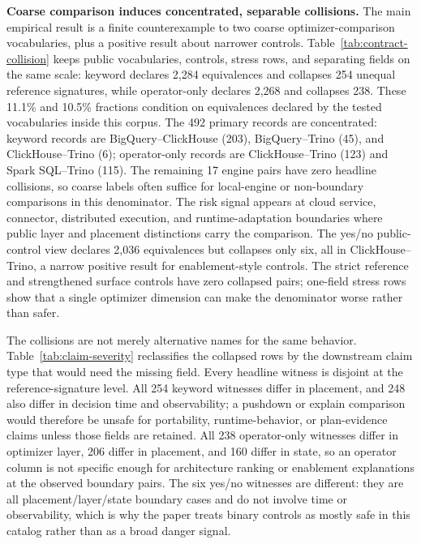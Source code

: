 \textbf{Coarse comparison induces concentrated, separable collisions.} The main empirical result is a finite counterexample to two coarse optimizer-comparison vocabularies, plus a positive result about narrower controls.  Table~\ref{tab:contract-collision} keeps public vocabularies, controls, stress rows, and separating fields on the same scale: keyword declares 2,284 equivalences and collapses 254 unequal reference signatures, while operator-only declares 2,268 and collapses 238.  These 11.1\% and 10.5\% fractions condition on equivalences declared by the tested vocabularies inside this corpus.  The 492 primary records are concentrated: keyword records are BigQuery--ClickHouse (203), BigQuery--Trino (45), and ClickHouse--Trino (6); operator-only records are ClickHouse--Trino (123) and Spark SQL--Trino (115).  The remaining 17 engine pairs have zero headline collisions, so coarse labels often suffice for local-engine or non-boundary comparisons in this denominator.  The risk signal appears at cloud service, connector, distributed execution, and runtime-adaptation boundaries where public layer and placement distinctions carry the comparison.  The yes/no public-control view declares 2,036 equivalences but collapses only six, all in ClickHouse--Trino, a narrow positive result for enablement-style controls.  The strict reference and strengthened surface controls have zero collapsed pairs; one-field stress rows show that a single optimizer dimension can make the denominator worse rather than safer.



The collisions are not merely alternative names for the same behavior.  Table~\ref{tab:claim-severity} reclassifies the collapsed rows by the downstream claim type that would need the missing field.  Every headline witness is disjoint at the reference-signature level.  All 254 keyword witnesses differ in placement, and 248 also differ in decision time and observability; a pushdown or explain comparison would therefore be unsafe for portability, runtime-behavior, or plan-evidence claims unless those fields are retained.  All 238 operator-only witnesses differ in optimizer layer, 206 differ in placement, and 160 differ in state, so an operator column is not specific enough for architecture ranking or enablement explanations at the observed boundary pairs.  The six yes/no witnesses are different: they are all placement/layer/state boundary cases and do not involve time or observability, which is why the paper treats binary controls as mostly safe in this catalog rather than as a broad danger signal.

